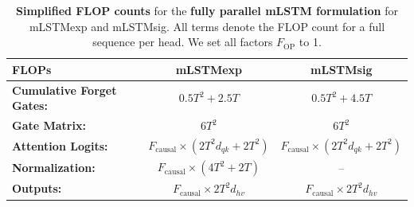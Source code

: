 \documentclass{article}
\begin{document}
    \begin{table}[htbp]
        \vspace{-0.3cm}
        \centering
        \caption{\label{tab:simpl_flop_counts_mlstm_parallel} \textbf{Simplified FLOP counts} for the \textbf{fully parallel mLSTM formulation} for mLSTMexp and mLSTMsig.
            All terms denote the FLOP count for a full sequence per head. We set all factors $F_\text{OP}$ to 1.}
        \vspace{0.2cm}
        \begin{tabular}{lcc}
            \toprule
            FLOPs                             & mLSTMexp                                                  & mLSTMsig                                                  \\
            \midrule
            \textbf{Cumulative Forget Gates:} & $0.5 T^2 + 2.5T$                                          & $0.5 T^2 + 4.5T$                                          \\
            \textbf{Gate Matrix:}             & $6 T^2$                                                   & $6 T^2$                                                   \\
            \textbf{Attention Logits:}        & $F_\text{causal} \times \left( 2T^2d_{qk} + 2T^2 \right)$ & $F_\text{causal} \times \left( 2T^2d_{qk} + 2T^2 \right)$ \\
            \textbf{Normalization:}           & $F_\text{causal} \times \left( 4T^2 + 2T \right)$         & --                                                        \\
            \textbf{Outputs:}                 & $F_\text{causal} \times 2 T^2 d_{hv}$                     & $F_\text{causal} \times 2 T^2 d_{hv}$                     \\
            \bottomrule
        \end{tabular}
        \vspace{-0.2cm}
    \end{table}
\end{document}
